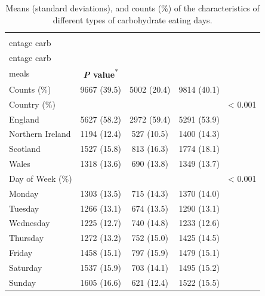 \begin{table}
	
	\caption{\label{tab:day-level-features}Means (standard deviations), and counts (\%) of the characteristics of different types of carbohydrate eating days.}\vspace{-0.3cm}
	\centering
	\fontsize{9}{11}\selectfont
	\begin{tabular}[t]{lcccc}
		\hiderowcolors
		\toprule
		& \textbf{\Centerstack{High perc-\\entage carb}} & \textbf{\Centerstack{Low perc-\\entage carb}} & \textbf{\Centerstack{Regular\\meals}} & \textbf{\textit{P} value}\textsuperscript{*}\\
		\midrule
		\showrowcolors
		Counts (\%) & 9667 (39.5) & 5002 (20.4) & 9814 (40.1) & \\
		Country (\%) &  &  &  & < 0.001\\
		\hspace{1em}England & 5627 (58.2) & 2972 (59.4) & 5291 (53.9) & \\
		\hspace{1em}Northern Ireland & 1194 (12.4) & 527 (10.5) & 1400 (14.3) & \\
		\hspace{1em}Scotland & 1527 (15.8) & 813 (16.3) & 1774 (18.1) & \\
		\hspace{1em}Wales & 1318 (13.6) & 690 (13.8) & 1349 (13.7) & \\
		Day of Week (\%) &  &  &  & < 0.001\\
		\hspace{1em}Monday & 1303 (13.5) & 715 (14.3) & 1370 (14.0) & \\
		\hspace{1em}Tuesday & 1266 (13.1) & 674 (13.5) & 1290 (13.1) & \\
		\hspace{1em}Wednesday & 1225 (12.7) & 740 (14.8) & 1233 (12.6) & \\
		\hspace{1em}Thursday & 1272 (13.2) & 752 (15.0) & 1425 (14.5) & \\
		\hspace{1em}Friday & 1458 (15.1) & 797 (15.9) & 1479 (15.1) & \\
		\hspace{1em}Saturday & 1537 (15.9) & 703 (14.1) & 1495 (15.2) & \\
		\hspace{1em}Sunday & 1605 (16.6) & 621 (12.4) & 1522 (15.5) & \\

\end{tabular}
\end{table}
